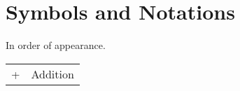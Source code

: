\chapter{Symbols and Notations}

In order of appearance.\\

\begin{tabular}{ll}
+					&	Addition\\
\end{tabular}
